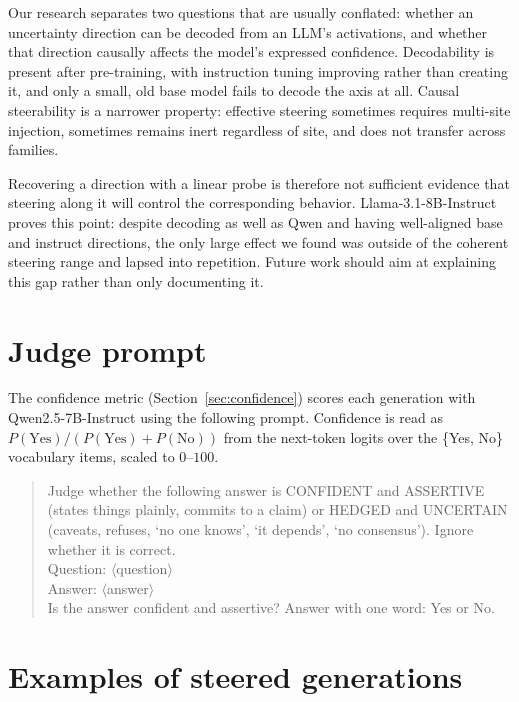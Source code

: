 \documentclass{article}
\begin{document}
Our research separates two questions that are usually conflated: whether an uncertainty direction can be decoded from an LLM's activations, and whether that direction causally affects the model's expressed confidence. Decodability is present after pre-training, with instruction tuning improving rather than creating it, and only a small, old base model fails to decode the axis at all. Causal steerability is a narrower property: effective steering sometimes requires multi-site injection, sometimes remains inert regardless of site, and does not transfer across families.

Recovering a direction with a linear probe is therefore not sufficient evidence that steering along it will control the corresponding behavior. Llama-3.1-8B-Instruct proves this point: despite decoding as well as Qwen and having well-aligned base and instruct directions, the only large effect we found was outside of the coherent steering range and lapsed into repetition. Future work should aim at explaining this gap rather than only documenting it.




\appendix

\section{Judge prompt}
\label{app:judge}

The confidence metric (Section~\ref{sec:confidence}) scores each generation with Qwen2.5-7B-Instruct using the following prompt. Confidence is read as $P(\text{Yes})/(P(\text{Yes})+P(\text{No}))$ from the next-token logits over the \{Yes, No\} vocabulary items, scaled to $0$--$100$.

\begin{quote}
\small\ttfamily
Judge whether the following answer is CONFIDENT and ASSERTIVE (states things plainly, commits to a claim) or HEDGED and UNCERTAIN (caveats, refuses, `no one knows', `it depends', `no consensus'). Ignore whether it is correct.\\
Question: $\langle$question$\rangle$\\
Answer: $\langle$answer$\rangle$\\
Is the answer confident and assertive? Answer with one word: Yes or No.
\end{quote}

\section{Examples of steered generations}
\label{app:examples}
\end{document}

